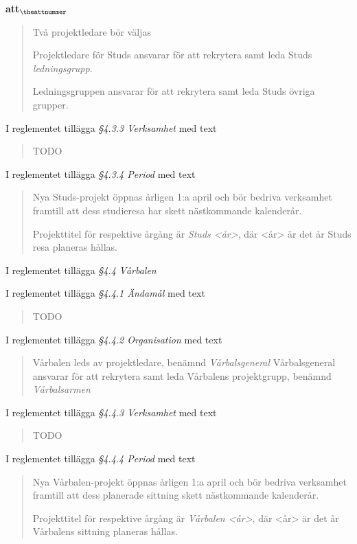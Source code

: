 \documentclass[a4paper]{article}
\begin{document}
\begin{list}{\bf att$_{\theattnummer}$}{}
\begin{quote}
        Två projektledare bör väljas

        Projektledare för Studs ansvarar för att rekrytera samt leda Studs \textit{ledningsgrupp}.

        Ledningsgruppen ansvarar för att rekrytera samt leda Studs övriga grupper.
    \end{quote}
\item I reglementet tillägga \textit{\S4.3.3 Verksamhet} med text
    \begin{quote}
        TODO
    \end{quote}
\item I reglementet tillägga \textit{\S4.3.4 Period} med text
    \begin{quote}
        Nya Studs-projekt öppnas årligen 1:a april och bör bedriva verksamhet framtill att dess studieresa har skett nästkommande kalenderår.

        Projekttitel för respektive årgång är \textit{Studs <år>}, där <år> är det år Studs resa planeras hållas.
    \end{quote}


\item I reglementet tillägga \textit{\S4.4 Vårbalen}
\item I reglementet tillägga \textit{\S4.4.1 Ändamål} med text
    \begin{quote}
        TODO
    \end{quote}
\item I reglementet tillägga \textit{\S4.4.2 Organisation} med text
    \begin{quote} Vårbalen leds av projektledare, benämnd \textit{Vårbalsgeneral}
        Vårbalsgeneral ansvarar för att rekrytera samt leda Vårbalens projektgrupp, benämnd \textit{Vårbalsarmen}
    \end{quote}
\item I reglementet tillägga \textit{\S4.4.3 Verksamhet} med text
    \begin{quote}
        TODO
    \end{quote}
\item I reglementet tillägga \textit{\S4.4.4 Period} med text
    \begin{quote}
        Nya Vårbalen-projekt öppnas årligen 1:a april och bör bedriva verksamhet framtill att dess planerade sittning skett nästkommande kalenderår.

        Projekttitel för respektive årgång är \textit{Vårbalen <år>}, där <år> är det år Vårbalens sittning planeras hållas.
    \end{quote}


\end{list}
\end{document}
